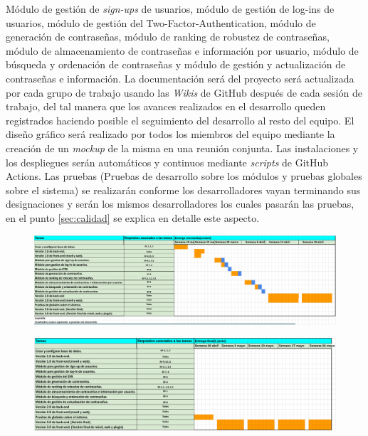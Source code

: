 \documentclass{article}
\begin{document}
Módulo de gestión de \textit{sign-ups} de usuarios, módulo de gestión de log-ins de usuarios, módulo de gestión del Two-Factor-Authentication, módulo de generación de contraseñas, módulo de ranking de robustez de contraseñas, módulo de almacenamiento de contraseñas e información por usuario, módulo de búsqueda y ordenación de contraseñas y módulo de gestión y actualización de contraseñas e información. La documentación será del proyecto será actualizada por cada grupo de trabajo usando las \textit{Wikis} de GitHub después de cada sesión de trabajo, del tal manera que los avances realizados en el desarrollo queden registrados haciendo posible el seguimiento del desarrollo al resto del equipo. El diseño gráfico será realizado por todos los miembros del equipo mediante la creación de un \textit{mockup} de la misma en una reunión conjunta. Las instalaciones y los despliegues serán automáticos y continuos mediante \textit{scripts} de GitHub Actions. Las pruebas (Pruebas de desarrollo sobre los módulos y pruebas globales sobre el sistema) se realizarán conforme los desarrolladores vayan terminando sus designaciones y serán los mismos desarrolladores los cuales pasarán las pruebas, en el punto \ref{sec:calidad} se explica en detalle este aspecto. 


\begin{figure}[H]
    \centering
        \includegraphics[height=0.18\textheight]{../images/diag-gantt-1.png}
    \label{gantt-1}
\end{figure}

\begin{figure}[H]
    \centering
        \includegraphics[height=0.18\textheight]{../images/diag-gantt-2.png}
    \label{gantt-2}
\end{figure}
\end{document}
